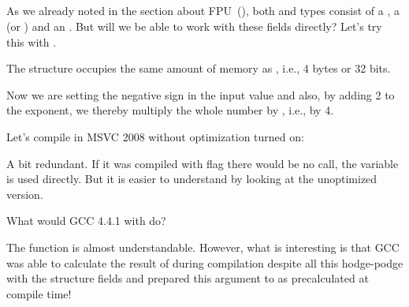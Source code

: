 \subsection{\WorkingWithFloatAsWithStructSubSubSectionName}
\label{sec:floatasstruct}

As we already noted in the section about FPU~(), 
both \Tfloat and \Tdouble types consist of a , 
a  (or ) and an .
But will we be able to work with these fields directly? Let's try this with \Tfloat.





The  structure occupies the same amount of  memory as \Tfloat, i.e., 4 bytes or 32 bits.

Now we are setting the negative sign in the input value and also, by adding 2 to the exponent, 
we thereby multiply the whole number by , i.e., by 4.

Let's compile in MSVC 2008 without optimization turned on:



A bit redundant.
If it was compiled with \Ox flag there would be no  call,
the  variable is used directly.
But it is easier to understand by looking at the unoptimized version.

What would GCC 4.4.1 with \Othree do?



The \ttf function is almost understandable. However, what is interesting is that GCC was able to calculate
the result of  during compilation despite all this hodge-podge with the structure fields
and prepared this argument to \printf{} as precalculated at compile time!

